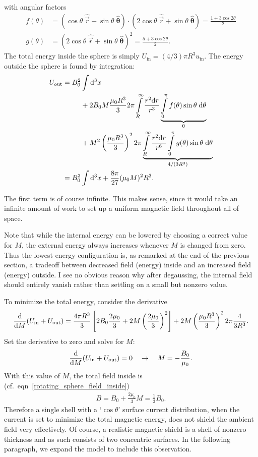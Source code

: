 %
with angular factors
%
\begin{align}
   f(\theta)&=(\cos\theta\;\hat{\vec r}-\sin\theta\;\hat{\boldsymbol\theta})
         \cdot(2\cos\theta\;\hat{\vec r}+\sin\theta\;\hat{\boldsymbol\theta})
      =\frac{1+3\cos2\theta}{2}\nonumber\\
   g(\theta)&=(2\cos\theta\;\hat{\vec r}+\sin\theta\;\hat{\boldsymbol\theta})^2
      =\frac{5+3\cos2\theta}{2}.\nonumber
\end{align}
%
The total energy inside the sphere is simply $U_\text{in}=(4/3)\pi
R^3u_\text{in}$. The energy outside the sphere is found by integration:
%
\begin{align}
   U_\text{out}=B_0^2&\int\mathrm{d}^3x\nonumber\\
   &+2B_0M\frac{\mu_0R^3}{3}2\pi\int\limits_R^\infty\frac{r^2\mathrm{d}
   r}{r^3}\underbrace{\int\limits_0^\pi f(\theta)\sin\theta\;\mathrm{d}\theta}_0\nonumber\\
   &+M^2\left(\frac{\mu_0R^3}{3}\right)^22\pi\underbrace{\int\limits_R^\infty\frac{r^2\mathrm{d}
   r}{r^6}\int\limits_0^\pi g(\theta)\sin\theta\;\mathrm{d}\theta}_{4/(3R^3)}\nonumber\\
    =B_0^2&\int\mathrm{d}^3x+\frac{8\pi}{27}(\mu_0M)^2R^3.\nonumber
\end{align}

The first term is of course infinite. This makes sense, since it would take an
infinite amount of work to set up a uniform magnetic field throughout all of
space.

Note that while the internal energy can be lowered by choosing a correct value
for $M$, the external energy always increases whenever $M$ is changed from zero.
Thus the lowest-energy configuration is, as remarked at the end of the previous
section, a tradeoff between decreased field (energy) inside and an increased
field (energy) outside. I see no obvious reason why after degaussing, the
internal field should entirely vanish rather than settling on a small but
nonzero value.

To minimize the total energy, consider the derivative
%
\begin{align}
   \frac{\mathrm{d}}{\mathrm{d} M}(U_\text{in}+U_\text{out})
   =\frac{4\pi R^3}{3}\left[2B_0\frac{2\mu_0}{3}+2M\left(\frac{2\mu_0}{3}\right)^2\right]
   +2M\left(\frac{\mu_0R^3}{3}\right)^22\pi\frac{4}{3R^3}.\nonumber
\end{align}
%
Set the derivative to zero and solve for $M$:
%
\begin{align}
   \label{single_shell_optimum}
   \frac{\mathrm{d}}{\mathrm{d} M}(U_\text{in}+U_\text{out})=0
   \quad\to\quad
   M=-\frac{B_0}{\mu_0}.
\end{align}
%
With this value of $M$, the total field inside is (cf.\
eqn~\ref{rotating_sphere_field_inside})
%
\begin{align}
   B=B_0+\frac{2\mu_0}{3}M=\frac{1}{3}B_0.\nonumber
\end{align}
%
Therefore a single shell with a `$\cos\theta$' surface current distribution,
when the current is set to minimize the total magnetic energy, does not shield
the ambient field very effectively. Of course, a realistic magnetic shield is a
shell of nonzero thickness and as such consists of two concentric surfaces. In
the following paragraph, we expand the model to include this observation.


